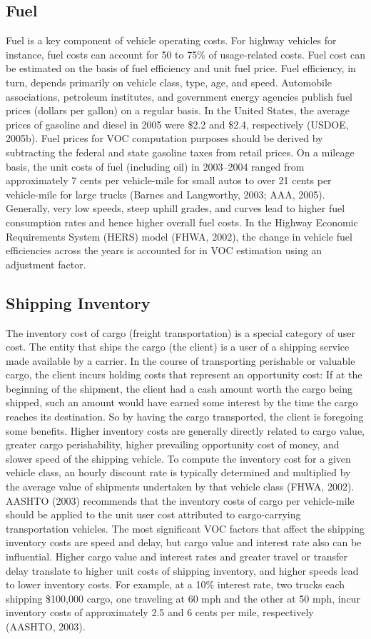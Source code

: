 \subsection{Fuel}
Fuel is a key component of vehicle operating costs. For highway vehicles for instance, fuel costs can account for 50 to 75\% of usage-related costs. Fuel cost can be estimated on the basis of fuel efficiency and unit fuel price. Fuel efficiency, in turn, depends primarily on vehicle class, type, age, and speed. Automobile associations, petroleum institutes, and government energy agencies publish fuel prices (dollars per gallon) on a regular basis. In the United States, the average prices of gasoline and diesel in 2005 were \$2.2 and \$2.4, respectively (USDOE, 2005b). Fuel prices for VOC computation purposes should be derived by subtracting the federal and state gasoline taxes from retail prices. On a mileage basis, the unit costs of fuel (including oil) in 2003–2004 ranged from approximately 7 cents per vehicle-mile for small autos to over 21 cents per vehicle-mile for large trucks (Barnes and Langworthy, 2003; AAA, 2005). Generally, very low speeds, steep uphill grades, and curves lead to higher fuel consumption rates and hence higher overall fuel costs. In the Highway Economic Requirements System (HERS) model (FHWA, 2002), the change in vehicle fuel efficiencies across the years is accounted for in VOC estimation using an adjustment factor.
\subsection{Shipping Inventory}
The inventory cost of cargo (freight transportation) is a special category of user cost. The entity that ships the cargo (the client) is a user of a shipping service made available by a carrier. In the course of transporting perishable or valuable cargo, the client incurs holding costs that represent an opportunity cost: If at the beginning of the shipment, the client had a cash amount worth the cargo being shipped, such an amount would have earned some interest by the time the cargo reaches its destination. So by having the cargo transported, the client is foregoing some benefits. Higher inventory costs are generally directly related to cargo value, greater cargo perishability, higher prevailing opportunity cost of money, and slower speed of the shipping vehicle. To compute the inventory cost for a given vehicle class, an hourly discount rate is typically determined and multiplied by the average value of shipments undertaken by that vehicle class (FHWA, 2002). AASHTO (2003) recommends that the inventory costs of cargo per vehicle-mile should be applied to the unit user cost attributed to cargo-carrying transportation vehicles. The most significant VOC factors that affect the shipping inventory costs are speed and delay, but cargo value and interest rate also can be influential. Higher cargo value and interest rates and greater travel or transfer delay translate to higher unit costs of shipping inventory, and higher speeds lead to lower inventory costs. For example, at a 10\% interest rate, two trucks each shipping \$100,000 cargo, one traveling at 60 mph and the other at 50 mph, incur inventory costs of approximately 2.5 and 6 cents per mile, respectively (AASHTO, 2003).
